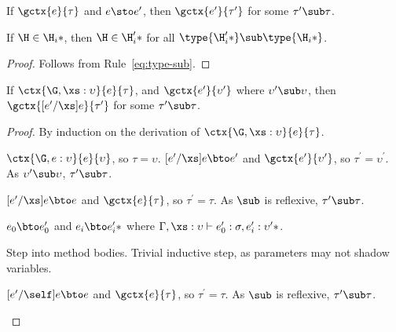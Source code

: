 \begin{theorem}[Preservation]
  \label{th:preservation}

  If $\gctx{e}{\tau}$ and $e \sto e^\prime$, then $\gctx{e^\prime}{\tau^\prime}$
  for some $\tau^\prime \sub \tau$.

  \begin{lemma}
    \label{lem:submethod}

    If $\H \in \*\H_i*$, then $\H \in \*\H^\prime_i*$ for all
    $\type{\*\H^\prime_i*} \sub \type{\*\H_i*}$.

    \begin{proof}
      Follows from Rule~\ref{eq:type-sub}.
    \end{proof}
  \end{lemma}

  \begin{lemma}
    \label{lem:preservation}

    If $\ctx{\G, \xs : \upsilon}{e}{\tau}$, and
    $\gctx{e^\prime}{\upsilon^\prime}$ where $\upsilon^\prime \sub \upsilon$,
    then $\gctx{[e^\prime/\xs]e}{\tau^\prime}$ for some $\tau^\prime \sub \tau$.

    \begin{proof}
      By induction on the derivation of $\ctx{\G, \xs : \upsilon}{e}{\tau}$.

      \begin{match}
        $\ctx{\G, e : \upsilon}{e}{\upsilon}$, so $\tau = \upsilon$.
        $[e^\prime/\xs]e \bto e^\prime$ and $\gctx{e^\prime}{\upsilon^\prime}$,
        so $\tau^\prime = \upsilon^\prime$.  As $\upsilon^\prime \sub \upsilon$,
        $\tau^\prime \sub \tau$.

        $[e^\prime/\xs]e \bto e$ and $\gctx{e}{\tau}$, so $\tau^\prime = \tau$.
        As $\sub$ is reflexive, $\tau^\prime \sub \tau$.

        $e_0 \bto e^\prime_0$ and $\*e_i \bto e^\prime_i*$ where $\Gamma, \xs :
        \upsilon \vdash e^\prime_0 : \sigma, \*e^\prime_i : \upsilon^\prime*$.

        Step into method bodies.  Trivial inductive step, as parameters may not
        shadow variables.

        $[e^\prime/\self]e \bto e$ and $\gctx{e}{\tau}$, so $\tau^\prime =
        \tau$. As $\sub$ is reflexive, $\tau^\prime \sub \tau$.
      \end{match}
    \end{proof}
  \end{lemma}


\end{theorem}
